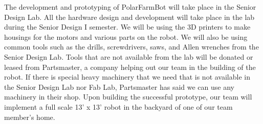 The development and prototyping of PolarFarmBot will take place in the Senior Design Lab.
All the hardware design and development will take place in the lab during the Senior Design I semester. We will be using the 3D printers to make housings for the motors and various parts on the robot.
We will also be using common tools such as the drills, screwdrivers, saws, and Allen wrenches from the Senior Design Lab.
Tools that are not available from the lab will be donated or leased from Partsmaster, a company helping out our team in the building of the robot. If there is special heavy machinery that we need that is not available in the Senior Design Lab nor Fab Lab, Partsmaster has said we can use any machinery in their shop.
Upon building the successful prototype, our team will implement a full scale 13' x 13' robot in the backyard of one of our team member's home.
